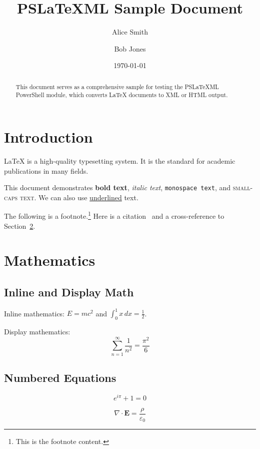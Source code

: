 \documentclass[12pt]{article}
\title{PSLaTeXML Sample Document}
\author{Alice Smith \and Bob Jones}
\date{\today}
\begin{document}
\maketitle
\tableofcontents

\begin{abstract}
This document serves as a comprehensive sample for testing the
PSLaTeXML PowerShell module, which converts \LaTeX{} documents to
XML or HTML output.
\end{abstract}

\section{Introduction}
\label{sec:intro}

\LaTeX{} is a high-quality typesetting system.
It is the standard for academic publications in many fields.

This document demonstrates \textbf{bold text}, \textit{italic text},
\texttt{monospace text}, and \textsc{small-caps text}.
We can also use \underline{underlined} text.

The following is a footnote.\footnote{This is the footnote content.}
Here is a citation~\cite{lamport1994} and a cross-reference to
Section~\ref{sec:math}.

\section{Mathematics}
\label{sec:math}

\subsection{Inline and Display Math}

Inline mathematics: $E = mc^2$ and $\int_0^1 x\,dx = \frac{1}{2}$.

Display mathematics:
$$
\sum_{n=1}^{\infty} \frac{1}{n^2} = \frac{\pi^2}{6}
$$

\subsection{Numbered Equations}

\begin{equation}
\label{eq:euler}
  e^{i\pi} + 1 = 0
\end{equation}

\begin{equation*}
  \nabla \cdot \mathbf{E} = \frac{\rho}{\varepsilon_0}
\end{equation*}
\end{document}
